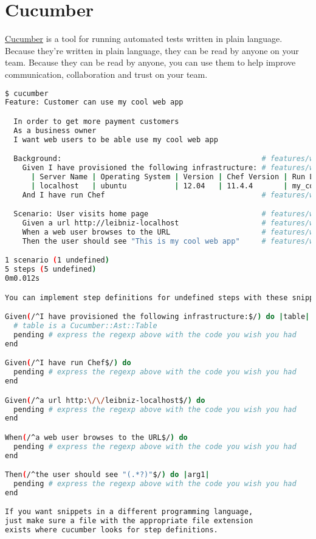 \section{Cucumber}
\label{sec:testing-cucumber-spec}

\href{http://cukes.info/}{Cucumber} is a tool for running automated tests written in plain language. Because they're written in plain language, they can be read by anyone on your team. Because they can be read by anyone, you can use them to help improve communication, collaboration and trust on your team.

\begin{lstlisting}[language=Bash,label=lst:testing-cucumber-spec1]
$ cucumber
Feature: Customer can use my cool web app

  In order to get more payment customers
  As a business owner
  I want web users to be able use my cool web app

  Background:                                              # features/working_web_page.feature:7
    Given I have provisioned the following infrastructure: # features/working_web_page.feature:8
      | Server Name | Operating System | Version | Chef Version | Run List             |
      | localhost   | ubuntu           | 12.04   | 11.4.4       | my_cool_app::default |
    And I have run Chef                                    # features/working_web_page.feature:12

  Scenario: User visits home page                          # features/working_web_page.feature:14
    Given a url http://leibniz-localhost                   # features/working_web_page.feature:15
    When a web user browses to the URL                     # features/working_web_page.feature:16
    Then the user should see "This is my cool web app"     # features/working_web_page.feature:17

1 scenario (1 undefined)
5 steps (5 undefined)
0m0.012s

You can implement step definitions for undefined steps with these snippets:

Given(/^I have provisioned the following infrastructure:$/) do |table|
  # table is a Cucumber::Ast::Table
  pending # express the regexp above with the code you wish you had
end

Given(/^I have run Chef$/) do
  pending # express the regexp above with the code you wish you had
end

Given(/^a url http:\/\/leibniz-localhost$/) do
  pending # express the regexp above with the code you wish you had
end

When(/^a web user browses to the URL$/) do
  pending # express the regexp above with the code you wish you had
end

Then(/^the user should see "(.*?)"$/) do |arg1|
  pending # express the regexp above with the code you wish you had
end

If you want snippets in a different programming language,
just make sure a file with the appropriate file extension
exists where cucumber looks for step definitions.
\end{lstlisting}



